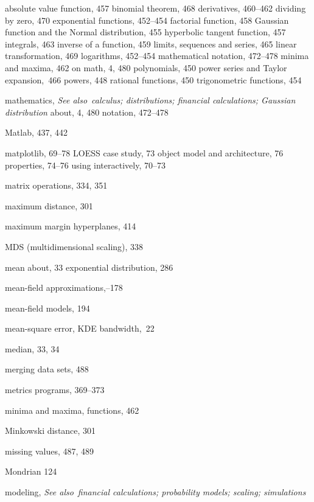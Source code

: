 \documentclass{Oreilly5980006}
\def\seealso{{\it See also}\ }
\begin{document}
\begin{theindex}
  \subitem absolute value function, 457
    \subitem binomial theorem, 468
    \subitem derivatives, 460--462
    \subitem dividing by zero, 470
    \subitem exponential functions, 452--454
    \subitem factorial function, 458
    \subitem Gaussian function and the Normal distribution, 455
    \subitem hyperbolic tangent function, 457
    \subitem integrals, 463
    \subitem inverse of a function, 459
    \subitem limits, sequences and series, 465
    \subitem linear transformation, 469
    \subitem logarithms, 452--454
    \subitem mathematical notation, 472--478
    \subitem minima and maxima, 462
    \subitem on math, 4, 480
    \subitem polynomials, 450
    \subitem power series and Taylor expansion,~466
    \subitem powers, 448
    \subitem rational functions, 450
    \subitem trigonometric functions, 454

  \item mathematics, 
		\seealso{}{\it calculus; distributions; financial calculations; Gaussian distribution} %
    \subitem about, 4, 480
    \subitem notation, 472--478
  \item Matlab, 437, 442
  \item matplotlib, 69--78
    \subitem LOESS case study, 73
    \subitem object model and architecture, 76
    \subitem properties, 74--76
    \subitem using interactively, 70--73
  \item matrix operations, 334, 351
  \item maximum distance, 301
  \item maximum margin hyperplanes, 414
  \item MDS (multidimensional scaling), 338
  \item mean
    \subitem about, 33
    \subitem exponential distribution, 286
  \item mean-field approximations,--178
  \item mean-field models, 194
  \item mean-square error, KDE bandwidth,~22
  \item median, 33, 34
  \item merging data sets, 488
  \item metrics programs, 369--373
  \item minima and maxima, functions, 462
  \item Minkowski distance, 301
  \item missing values, 487, 489
\item Mondrian 124
  \item modeling, 
		\seealso{}{\it financial calculations; probability models; scaling; simulations} %

\end{theindex}
\end{document}
